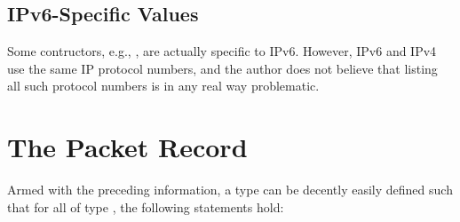\documentclass{report}
\begin{document}
\subsection{IPv6-Specific Values}
Some  contructors, e.g., , are actually specific to IPv6.  However, IPv6 and IPv4 use the same IP protocol numbers, and the author does not believe that listing all such protocol numbers is in any real way problematic.

\section{The Packet Record}
Armed with the preceding information, a type  can be decently easily defined such that for all  of type , the following statements hold:
\end{document}
